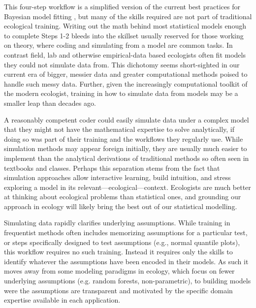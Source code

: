 \documentclass[11pt]{article}
\begin{document}
This four-step workflow is a simplified version of the current best practices for Bayesian model fitting  \citep{betanworkflow,vandeschoot2021}, but many of the skills required are not part of traditional ecological training. Writing out the math behind most statistical models enough to complete Steps 1-2 bleeds into the skillset usually reserved for those working on theory, where coding and simulating from a model are common tasks. In contrast field, lab and otherwise empirical-data based ecologists often fit models they could not simulate data from. This dichotomy seems short-sighted in our current era of bigger, messier data and greater computational methods poised to handle such messy data. Further, given the increasingly computational toolkit of the modern ecologist, training in how to simulate data from models may be a smaller leap than decades ago.  

A reasonably competent coder could easily simulate data under a complex model that they might not have the mathematical expertise to solve analytically, if doing so was part of their training and the workflows they regularly use. While simulation methods may appear foreign initially, they are usually much easier to implement than the analytical derivations of traditional methods so often seen in textbooks and classes.  Perhaps this separation stems from the fact that simulation approaches allow interactive learning, build intuition, and stress exploring a model in its relevant---ecological---context. Ecologists are much better at thinking about ecological problems than statistical ones, and grounding our approach in ecology will likely bring the best out of our statistical modelling. %

Simulating data rapidly clarifies underlying assumptions. While training in frequentist methods often includes memorizing assumptions for a particular test, or steps specifically designed to test assumptions (e.g., normal quantile plots), this workflow requires no such training. Instead it requires only the skills to identify whatever the assumptions have been encoded in their models. As such it moves away from some modeling paradigms in ecology, which focus on fewer underlying assumptions (e.g. random forests, non-parametric), to building models were the assumptions are transparent and motivated by the specific domain expertise available in each application. %
\end{document}
